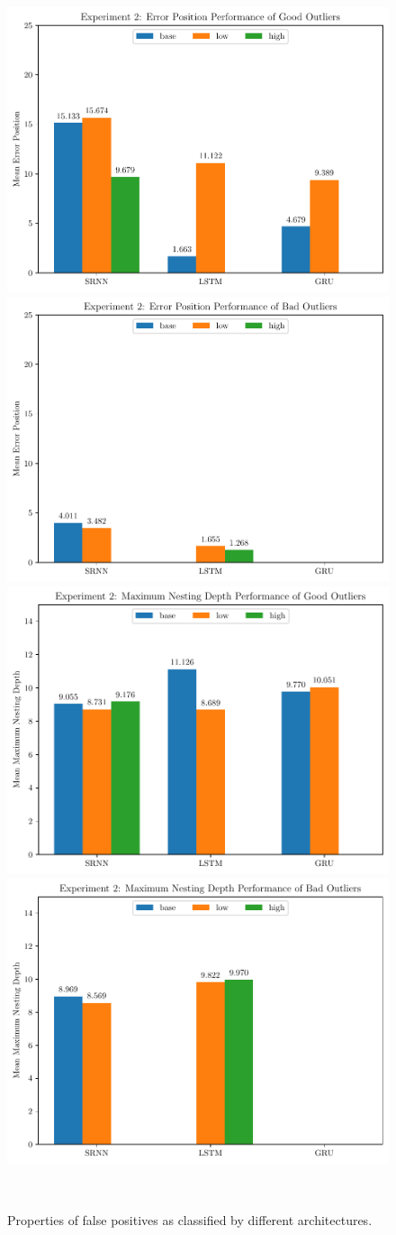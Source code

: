 \begin{figure}[!tbp]
\begin{minipage}{\textwidth}
     \centering
     \includegraphics[width=.45\textwidth]{fig/ND_error_pos_good}\quad
     \includegraphics[width=.45\textwidth]{fig/ND_error_pos_bad}\\
     \includegraphics[width=.45\textwidth]{fig/ND_max_valid_nesting_depth_good}\quad
     \includegraphics[width=.45\textwidth]{fig/ND_max_valid_nesting_depth_bad}
     \label{fig:FP_Prop_ND}
   \end{minipage}\\
  \caption{Properties of false positives as classified by different architectures.}
\end{figure}

